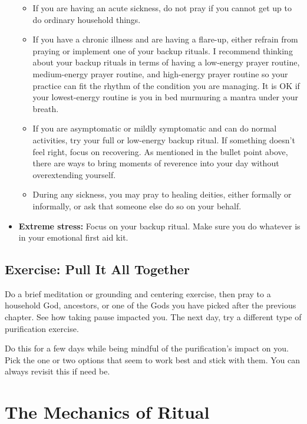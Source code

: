 \documentclass[
]{book}
\providecommand{\tightlist}{%
  \setlength{\itemsep}{0pt}\setlength{\parskip}{0pt}}
\begin{document}
\begin{itemize}
  \begin{itemize}
  \tightlist
  \item
    If you are having an acute sickness, do not pray if you cannot get up to do ordinary household things.
  \item
    If you have a chronic illness and are having a flare-up, either refrain from praying or implement one of your backup rituals. I recommend thinking about your backup rituals in terms of having a low-energy prayer routine, medium-energy prayer routine, and high-energy prayer routine so your practice can fit the rhythm of the condition you are managing. It is OK if your lowest-energy routine is you in bed murmuring a mantra under your breath.
  \item
    If you are asymptomatic or mildly symptomatic and can do normal activities, try your full or low-energy backup ritual. If something doesn't feel right, focus on recovering. As mentioned in the bullet point above, there are ways to bring moments of reverence into your day without overextending yourself.
  \item
    During any sickness, you may pray to healing deities, either formally or informally, or ask that someone else do so on your behalf.
  \end{itemize}
\item
  \textbf{Extreme stress:} Focus on your backup ritual. Make sure you do whatever is in your emotional first aid kit.
\end{itemize}

\hypertarget{exercise-pull-it-all-together}{%
\section{Exercise: Pull It All Together}\label{exercise-pull-it-all-together}}

Do a brief meditation or grounding and centering exercise, then pray to a household God, ancestors, or one of the Gods you have picked after the previous chapter. See how taking pause impacted you. The next day, try a different type of purification exercise.

Do this for a few days while being mindful of the purification's impact on you. Pick the one or two options that seem to work best and stick with them. You can always revisit this if need be.

\hypertarget{the-mechanics-of-ritual}{%
\chapter{The Mechanics of Ritual}\label{the-mechanics-of-ritual}}
\end{document}
